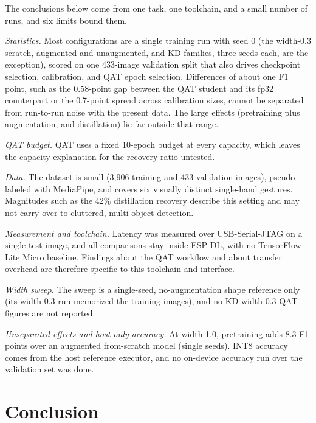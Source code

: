 \documentclass[conference]{IEEEtran}
\begin{document}
	The conclusions below come from one task, one toolchain, and a small number of runs, and six limits bound them.
	
	\emph{Statistics.} Most configurations are a single training run with seed 0 (the width-0.3 scratch, augmented and unaugmented, and KD families, three seeds each, are the exception), scored on one 433-image validation split that also drives checkpoint selection, calibration, and QAT epoch selection. Differences of about one F1 point, such as the 0.58-point gap between the QAT student and its fp32 counterpart or the 0.7-point spread across calibration sizes, cannot be separated from run-to-run noise with the present data. The large effects (pretraining plus augmentation, and distillation) lie far outside that range.
	
	\emph{QAT budget.} QAT uses a fixed 10-epoch budget at every capacity, which leaves the capacity explanation for the recovery ratio untested.
	
	\emph{Data.} The dataset is small (3{,}906 training and 433 validation images), pseudo-labeled with MediaPipe, and covers six visually distinct single-hand gestures. Magnitudes such as the 42\% distillation recovery describe this setting and may not carry over to cluttered, multi-object detection.
	
	\emph{Measurement and toolchain.} Latency was measured over USB-Serial-JTAG on a single test image, and all comparisons stay inside ESP-DL, with no TensorFlow Lite Micro baseline. Findings about the QAT workflow and about transfer overhead are therefore specific to this toolchain and interface.
	
	\emph{Width sweep.} The sweep is a single-seed, no-augmentation shape reference only (its width-0.3 run memorized the training images), and no-KD width-0.3 QAT figures are not reported.
	
	\emph{Unseparated effects and host-only accuracy.} At width 1.0, pretraining adds 8.3 F1 points over an augmented from-scratch model (single seeds). INT8 accuracy comes from the host reference executor, and no on-device accuracy run over the validation set was done.
	
	\section{Conclusion}
	
\end{document}
